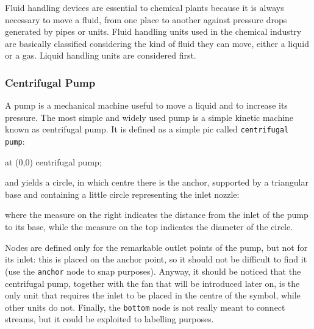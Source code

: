 \documentclass[12pt]{article}						%
\newcommand*{\chpn}[1]{\texttt{#1}}				%
\newcommand*{\chpp}[1]{\texttt{#1}}				%
\begin{document}
Fluid handling devices are essential to chemical plants because it is always
necessary to move a fluid, from one place to another against pressure drops
generated by pipes or units. Fluid handling units used in the chemical industry
are basically classified considering the kind of fluid they can move, either a
liquid or a gas. Liquid handling units are considered first.

\subsubsection{Centrifugal Pump}

A pump is a mechanical machine useful to move a liquid and to increase its
pressure. The most simple and widely used pump is a simple kinetic machine known
as centrifugal pump. It is defined as a simple pic called
\chpp{centrifugal pump}:
\begin{chpcode}
	\pic at (0,0) {centrifugal pump};
\end{chpcode}
and yields a circle, in which centre there is the anchor, supported by a 
triangular base and containing a little circle representing the inlet nozzle:
\begin{center}
\end{center}
where the measure on the right indicates the distance from the inlet of the pump
to its base, while the measure on the top indicates the diameter of the circle.

Nodes are defined only for the remarkable outlet points of the pump, but not for
its inlet: this is placed on the anchor point, so it should not be difficult to
find it (use the \chpn{anchor} node to snap purposes). Anyway, it should be
noticed that the centrifugal pump, together with the fan that will be introduced
later on, is the only unit that requires the inlet to be placed in the centre of
the symbol, while other units do not. Finally, the \chpn{bottom} node is not
really meant to connect streams, but it could be exploited to labelling purposes.
\end{document}
